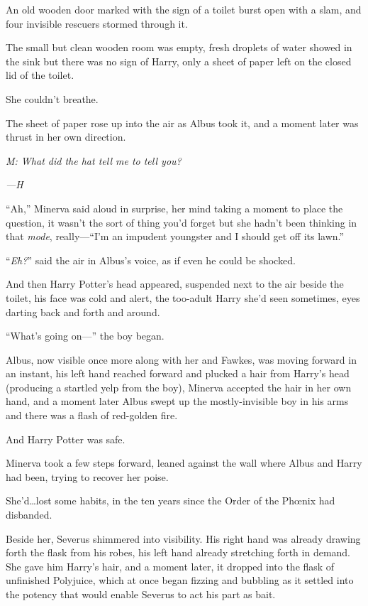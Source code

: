 An old wooden door marked with the sign of a toilet burst open with a slam, and four invisible rescuers stormed through it.

The small but clean wooden room was empty, fresh droplets of water showed in the sink but there was no sign of Harry, only a sheet of paper left on the closed lid of the toilet.

She couldn’t breathe.

The sheet of paper rose up into the air as Albus took it, and a moment later was thrust in her own direction.

\emph{M: What did the hat tell me to tell you?}

\emph{—H}

“Ah,” Minerva said aloud in surprise, her mind taking a moment to place the question, it wasn’t the sort of thing you’d forget but she hadn’t been thinking in that \emph{mode}, really—“I’m an impudent youngster and I should get off its lawn.”

“\emph{Eh?}” said the air in Albus’s voice, as if even he could be shocked.

And then Harry Potter’s head appeared, suspended next to the air beside the toilet, his face was cold and alert, the too-adult Harry she’d seen sometimes, eyes darting back and forth and around.

“What’s going on—” the boy began.

Albus, now visible once more along with her and Fawkes, was moving forward in an instant, his left hand reached forward and plucked a hair from Harry’s head (producing a startled yelp from the boy), Minerva accepted the hair in her own hand, and a moment later Albus swept up the mostly-invisible boy in his arms and there was a flash of red-golden fire.

And Harry Potter was safe.

Minerva took a few steps forward, leaned against the wall where Albus and Harry had been, trying to recover her poise.

She’d…lost some habits, in the ten years since the Order of the Phœnix had disbanded.

Beside her, Severus shimmered into visibility. His right hand was already drawing forth the flask from his robes, his left hand already stretching forth in demand. She gave him Harry’s hair, and a moment later, it dropped into the flask of unfinished Polyjuice, which at once began fizzing and bubbling as it settled into the potency that would enable Severus to act his part as bait.

